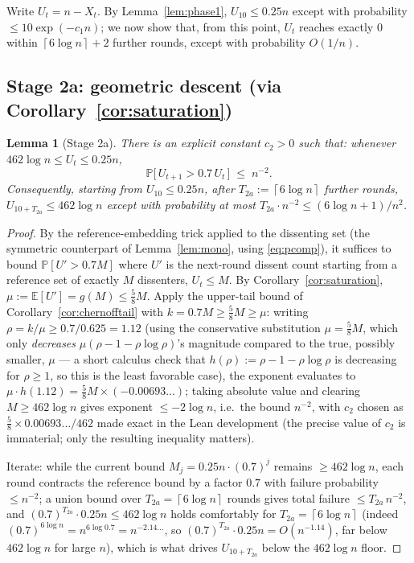 \documentclass[11pt]{article}
\newtheorem{lemma}[theorem]{Lemma}
\newcommand{\E}{\mathbb{E}}
\renewcommand{\Pr}{\mathbb{P}}
\newcommand{\ceil}[1]{\left\lceil #1 \right\rceil}
\begin{document}
Write $U_t = n-X_t$. By Lemma~\ref{lem:phase1}, $U_{10} \le 0.25n$ except
with probability $\le 10\exp(-c_1n)$; we now show that, from this point,
$U_t$ reaches exactly $0$ within $\ceil{6\log n}+2$ further rounds, except
with probability $O(1/n)$.

\subsection*{Stage 2a: geometric descent (via Corollary~\ref{cor:saturation})}

\begin{lemma}[Stage 2a]\label{lem:stage2a}
There is an explicit constant $c_2 > 0$ such that: whenever $462\log n \le
U_t \le 0.25n$,
\[
  \Pr\bigl[\, U_{t+1} > 0.7\,U_t \,\bigr] \;\le\; n^{-2}.
\]
Consequently, starting from $U_{10} \le 0.25n$, after $T_{2a} :=
\ceil{6\log n}$ further rounds, $U_{10+T_{2a}} \le 462\log n$ except with
probability at most $T_{2a}\cdot n^{-2} \le (6\log n + 1)/n^2$.
\end{lemma}
\begin{proof}
By the reference-embedding trick applied to the dissenting set (the
symmetric counterpart of Lemma~\ref{lem:mono}, using \eqref{eq:pcomp}), it
suffices to bound $\Pr[U' > 0.7M]$ where $U'$ is the next-round dissent
count starting from a reference set of exactly $M$ dissenters, $U_t \le M$.
By Corollary~\ref{cor:saturation}, $\mu := \E[U'] = g(M) \le \tfrac58 M$.
Apply the upper-tail bound of Corollary~\ref{cor:chernofftail} with $k =
0.7M \ge \tfrac58 M \ge \mu$: writing $\rho = k/\mu \ge 0.7/0.625 = 1.12$
(using the conservative substitution $\mu = \tfrac58 M$, which only
\emph{decreases} $\mu(\rho-1-\rho\log\rho)$'s magnitude compared to the true,
possibly smaller, $\mu$ — a short calculus check that $h(\rho):=\rho-1-\rho
\log\rho$ is decreasing for $\rho\ge1$, so this is the least favorable
case), the exponent evaluates to $\mu\cdot h(1.12) = \tfrac58 M\times
(-0.00693\ldots)$; taking absolute value and clearing $M \ge 462\log n$
gives exponent $\le -2\log n$, i.e.\ the bound $n^{-2}$, with $c_2$ chosen
as $\tfrac58\times0.00693\ldots/462$ made exact in the Lean development
(the precise value of $c_2$ is immaterial; only the resulting inequality
matters).

Iterate: while the current bound $M_j = 0.25n\cdot(0.7)^j$ remains
$\ge462\log n$, each round contracts the reference bound by a factor $0.7$
with failure probability $\le n^{-2}$; a union bound over $T_{2a}=
\ceil{6\log n}$ rounds gives total failure $\le T_{2a}\,n^{-2}$, and
$(0.7)^{T_{2a}}\cdot 0.25n \le 462\log n$ holds comfortably for $T_{2a} =
\ceil{6\log n}$ (indeed $(0.7)^{6\log n} = n^{6\log 0.7} = n^{-2.14\ldots}$,
so $(0.7)^{T_{2a}}\cdot0.25n = O(n^{-1.14})$, far below $462\log n$ for large
$n$), which is what drives $U_{10+T_{2a}}$ below the $462\log n$ floor.
\end{proof}
\end{document}
